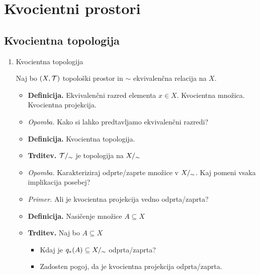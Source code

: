\section{Kvocientni prostori}

\subsection{Kvocientna topologija}
\begin{enumerate}
    \item Kvocientna topologija
    
    Naj bo \((X, \mathcal{T})\) topološki prostor in \(\sim\) ekvivalenčna relacija na \(X\).
    \begin{itemize}
        \item \colorbox{purple!30}{\textbf{Definicija.}} Ekvivalenčni razred elementa \(x \in X\). Kvocientna množica. Kvocientna projekcija.
        \item \colorbox{yellow!30}{\emph{Opomba.}} Kako si lahko predtavljamo ekvivalenčni razredi?
        \item \colorbox{purple!30}{\textbf{Definicija.}} Kvocientna topologija.
        \item \colorbox{blue!30}{\textbf{Trditev.}} \(\mathcal{T}/_\sim\) je topologija na \({X/_\sim}\)
        \item \colorbox{yellow!30}{\emph{Opomba.}}  Karakteriziraj odprte/zaprte množice v \({X/_\sim}\). Kaj pomeni vsaka implikacija posebej?
        \item \colorbox{yellow!30}{\emph{Primer.}} Ali je kvocientna projekcija vedno odprta/zaprta?
        \item \colorbox{purple!30}{\textbf{Definicija.}} Nasičenje množice \(A \subseteq X\)
        \item \colorbox{blue!30}{\textbf{Trditev.}} Naj bo \(A \subseteq X\) 
        \begin{itemize}
            \item Kdaj je \(q_{*}(A) \subseteq {X/_\sim}\) odprta/zaprta?
            \item Zadosten pogoj, da je kvocientna projekcija odprta/zaprta.
        \end{itemize}
    \end{itemize}
\end{enumerate}

